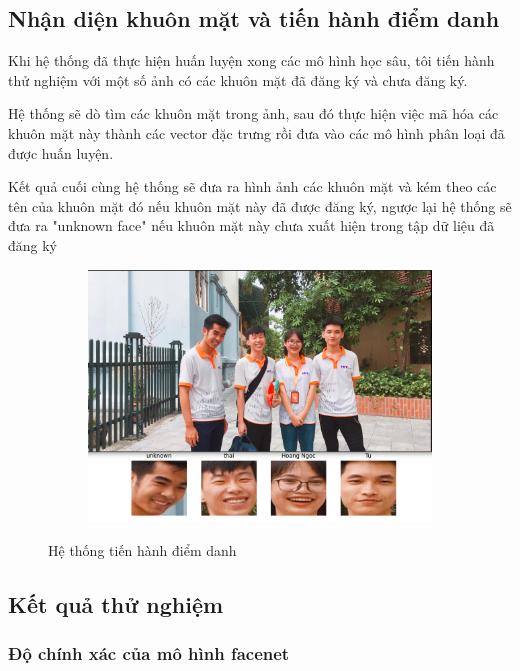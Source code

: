 \newpage
\subsection{Nhận diện khuôn mặt và tiến hành điểm danh}
Khi hệ thống đã thực hiện huấn luyện xong các mô hình học sâu, tôi tiến hành thử nghiệm với một số ảnh có các khuôn mặt đã
đăng ký và chưa đăng ký.

Hệ thống sẽ dò tìm các khuôn mặt trong ảnh, sau đó thực hiện việc mã hóa các khuôn mặt này thành các vector đặc trưng
rồi đưa vào các mô hình phân loại đã được huấn luyện.

Kết quả cuối cùng hệ thống sẽ đưa ra hình ảnh các khuôn mặt và kém theo các tên của khuôn mặt đó
nếu khuôn mặt này đã được đăng ký, ngược lại hệ thống sẽ đưa ra "unknown face" nếu khuôn mặt này
chưa xuất hiện trong tập dữ liệu đã đăng ký

\begin{figure}
    \begin{subfigure}{1\textwidth}
        \includegraphics[width=1\linewidth]{Chapters/items/recog.png}
        \label{fig:recog}
    \end{subfigure}
    \caption{Hệ thống tiến hành điểm danh}
\end{figure}
\newpage
\subsection{Kết quả thử nghiệm}
\subsubsection{Độ chính xác của mô hình facenet}


